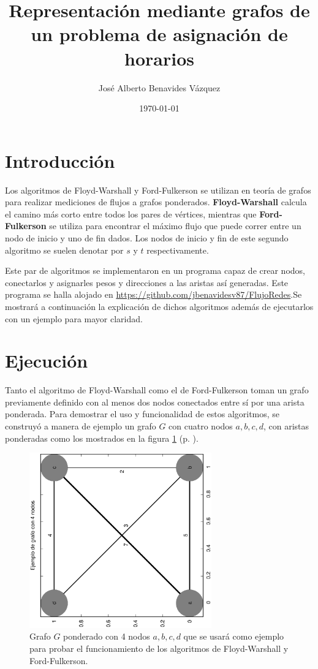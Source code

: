 \documentclass{article}
\title{Representación mediante grafos de un problema de asignación de horarios}
\author{José Alberto Benavides Vázquez}
\date{\today}
\begin{document}
  \maketitle

  \section{Introducción}

  Los algoritmos de Floyd-Warshall y Ford-Fulkerson se utilizan en teoría de grafos para realizar mediciones de flujos a grafos ponderados. \textbf{Floyd-Warshall} calcula el camino más corto entre todos los pares de vértices, mientras que \textbf{Ford-Fulkerson} se utiliza para encontrar el máximo flujo que puede correr entre un nodo de inicio y uno de fin dados. Los nodos de inicio y fin de este segundo algoritmo se suelen denotar por $s$ y $t$ respectivamente.

  Este par de algoritmos se implementaron en un programa capaz de crear nodos, conectarlos y asignarles pesos y direcciones a las aristas así generadas. Este programa se halla alojado en \url{https://github.com/jbenavidesv87/FlujoRedes}.Se mostrará a continuación la explicación de dichos algoritmos además de ejecutarlos con un ejemplo para mayor claridad.

  \section{Ejecución}
  Tanto el algoritmo de Floyd-Warshall como el de Ford-Fulkerson toman un grafo previamente definido con al menos dos nodos conectados entre sí por una arista ponderada. Para demostrar el uso y funcionalidad de estos algoritmos, se construyó a manera de ejemplo un grafo $G$ con cuatro nodos $a, b, c, d$, con aristas ponderadas como los mostrados en la figura \ref{fig:ejemplo} (p. \pageref{fig:ejemplo}).

  \begin{figure}[h]
    \includegraphics[width=0.7\textwidth, angle=-90]{ejemplo} %
    \centering
    \caption{Grafo $G$ ponderado con 4 nodos $a, b, c, d$ que se usará como ejemplo para probar el funcionamiento de los algoritmos de Floyd-Warshall y Ford-Fulkerson.}
    \label{fig:ejemplo}
  \end{figure}
\end{document}
